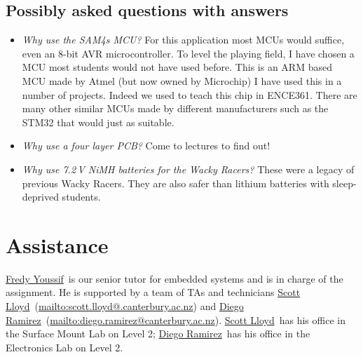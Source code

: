 \documentclass[11pt, a4paper]{article}
\makeatletter
\newcommand{\scottemail}{\url{mailto:scott.lloyd@.canterbury.ac.nz}}
\newcommand{\diegoemail}{\url{mailto:diego.ramirez@canterbury.ac.nz}}
\newcommand{\fredy}{\href{mailto:fredy.youssif@pg.canterbury.ac.nz}{Fredy Youssif}}
\newcommand{\scott}{\href{mailto:scott.lloyd@.canterbury.ac.nz}{Scott Lloyd}}
\newcommand{\diego}{\href{mailto:diego.ramirez@canterbury.ac.nz}{Diego Ramirez}}
\makeatother
\begin{document}
\subsection{Possibly asked questions with answers}

\begin{itemize}
\item \emph{Why use the SAM4s MCU?}  For this application most MCUs
  would suffice, even an 8-bit AVR microcontroller.  To level the
  playing field, I have chosen a MCU most students would not have used
  before.  This is an ARM based MCU made by Atmel (but now owned by
  Microchip) I have used this in a number of projects.  Indeed we used
  to teach this chip in ENCE361.  There are many other similar MCUs
  made by different manufacturers such as the STM32 that would just as
  suitable.

\item \emph{Why use a four layer PCB?}  Come to lectures to find out!

\item \emph{Why use 7.2\,V NiMH batteries for the Wacky Racers?}
  These were a legacy of previous Wacky Racers.  They are also safer
  than lithium batteries with sleep-deprived students.


\end{itemize}


\section{Assistance}

\fredy\ is our senior tutor for embedded systems and is in charge of
the assignment.  He is supported by a team of TAs and technicians
\scott\ (\scottemail) and \diego\ (\diegoemail).  \scott\ has his
office in the Surface Mount Lab on Level 2; \diego\ has his office in
the Electronics Lab on Level 2.
\end{document}
